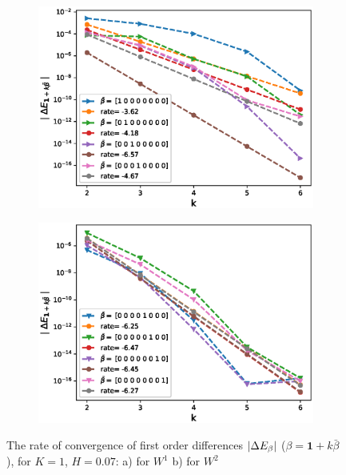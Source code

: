 \documentclass[11pt]{article}
\begin{document}
\begin{figure}[h!]
	\centering
	\begin{subfigure}{.4\textwidth}
		\centering
		\includegraphics[width=1\linewidth]{./figures/rBergomi_mixed_error_rates/without_change_measure/N_4/H_007/first_difference_rbergomi_4steps_H_007_K_1_totally_hierarch_with_rate_W1}
		\caption{}
		\label{fig:sub3}
	\end{subfigure}%
	\begin{subfigure}{.4\textwidth}
		\centering
		\includegraphics[width=1\linewidth]{./figures/rBergomi_mixed_error_rates/without_change_measure/N_4/H_007/first_difference_rbergomi_4steps_H_007_K_1_totally_hierarch_with_rate_W2}
		\caption{}
		\label{fig:sub4}
	\end{subfigure}



	\caption{The rate of convergence of  first order differences $\left\lvert\Delta E_{\beta}\right\rvert$ ($\beta=\mathbf{1}+k \bar{\beta}$), for $K=1$, $H=0.07$: a) for $W^1$ b) for $W^2$}
		\label{fig:first_diff_comp_K_1_H_007_wihtout_change_measure}
\end{figure}
\end{document}
